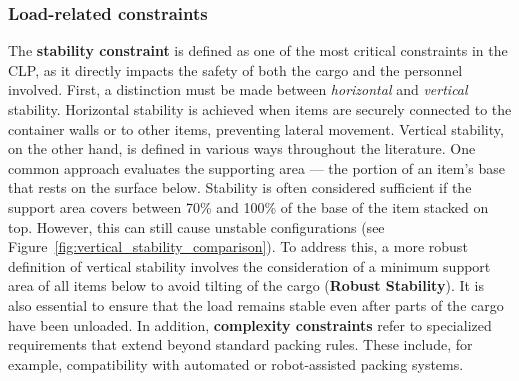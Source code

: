 \subsubsection{Load-related constraints}

The \textbf{stability constraint} is defined as one of the most critical constraints
in the \gls{CLP}, as it directly impacts
the safety of both the cargo and the personnel involved. First, a distinction
must be made between \textit{horizontal} and \textit{vertical} stability.
Horizontal stability is achieved when items are securely connected to the
container walls or to other items, preventing lateral movement. Vertical
stability, on the other hand, is defined in various ways throughout the
literature. One common approach evaluates the supporting area — the portion
of an item's base that rests on the surface below. Stability is often
considered sufficient if the support area covers between 70\% and 100\% of the base
of the item stacked on top. However, this can still cause unstable
configurations (see Figure~\ref{fig:vertical_stability_comparison}). To address this,
a more robust definition of vertical stability involves the consideration of a minimum support area
of all items below to avoid tilting of the cargo (\textbf{Robust Stability}). It is also essential to
ensure that the load remains stable even after parts of the cargo have been
unloaded. In addition, \textbf{complexity constraints} refer to specialized
requirements that extend beyond standard packing rules. These include,
for example, compatibility with automated or robot-assisted packing systems.

